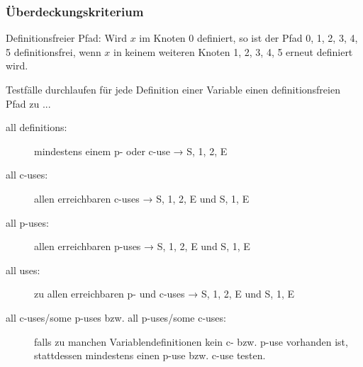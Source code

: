 \documentclass{lehramt-informatik}
\begin{document}

%

\subsubsection{Überdeckungskriterium}

Definitionsfreier Pfad: Wird $x$ im Knoten $0$ definiert, so ist der
Pfad 0, 1, 2, 3, 4, 5 definitionsfrei, wenn $x$ in keinem weiteren
Knoten 1, 2, 3, 4, 5 erneut definiert wird.

\bigskip\noindent
Testfälle durchlaufen für jede Definition einer Variable einen
definitionsfreien Pfad zu ...

\begin{description}

\item[all definitions:] mindestens einem p- oder c-use
→ S, 1, 2, E

\item[all c-uses:] allen erreichbaren c-uses
→ S, 1, 2, E und S, 1, E

\item[all p-uses:] allen erreichbaren p-uses
→ S, 1, 2, E und S, 1, E

\item[all uses:] zu allen erreichbaren p- und c-uses
→ S, 1, 2, E und S, 1, E

\item[all c-uses/some p-uses bzw. all p-uses/some c-uses:] falls zu
manchen Variablendefinitionen kein c- bzw. p-use vorhanden ist,
stattdessen mindestens einen p-use bzw. c-use testen.
\end{description}
\end{document}
